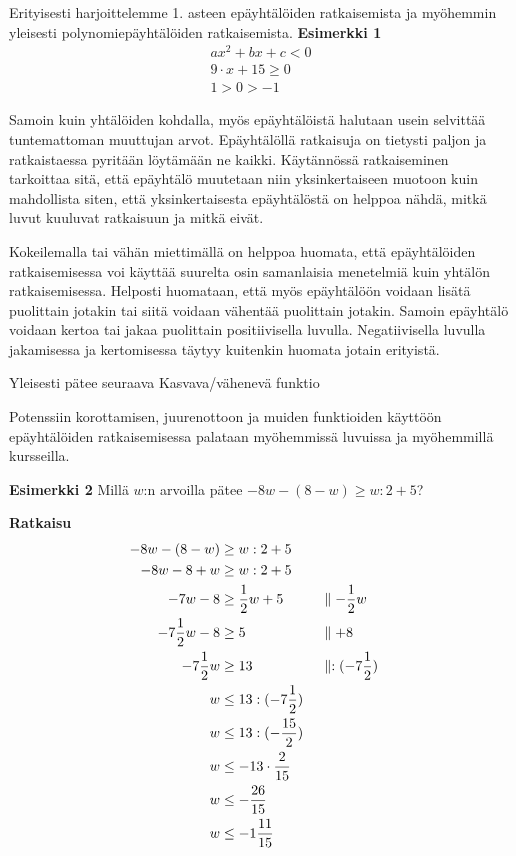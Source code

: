 Erityisesti harjoittelemme 1. asteen epäyhtälöiden ratkaisemista ja myöhemmin yleisesti polynomiepäyhtälöiden ratkaisemista.
\textbf{Esimerkki 1}
\begin{align*}
ax^2+bx+c<0 \\
9 \cdot x+15\geq 0 \\
1>0>-1
\end{align*}

Samoin kuin yhtälöiden kohdalla, myös epäyhtälöistä halutaan usein selvittää
tuntemattoman muuttujan arvot. Epäyhtälöllä ratkaisuja on tietysti paljon ja ratkaistaessa
pyritään löytämään ne kaikki. Käytännössä ratkaiseminen tarkoittaa sitä, että epäyhtälö
muutetaan niin yksinkertaiseen muotoon kuin mahdollista siten, että yksinkertaisesta epäyhtälöstä
on helppoa nähdä, mitkä luvut kuuluvat ratkaisuun ja mitkä eivät.

Kokeilemalla tai vähän miettimällä on helppoa huomata, että epäyhtälöiden ratkaisemisessa
voi käyttää suurelta osin samanlaisia menetelmiä kuin yhtälön ratkaisemisessa. Helposti huomataan,
että myös epäyhtälöön voidaan lisätä puolittain jotakin tai siitä voidaan vähentää puolittain jotakin.
Samoin epäyhtälö voidaan kertoa tai jakaa puolittain positiivisella luvulla. Negatiivisella luvulla
jakamisessa ja kertomisessa täytyy kuitenkin huomata jotain erityistä.


Yleisesti pätee seuraava
	Kasvava/vähenevä funktio




Potenssiin korottamisen, juurenottoon ja muiden funktioiden käyttöön epäyhtälöiden ratkaisemisessa palataan myöhemmissä luvuissa ja myöhemmillä kursseilla.

\textbf{Esimerkki 2}
Millä $w$:n arvoilla pätee $-8w-(8-w)\geq w:2+5$?

\textbf{Ratkaisu}
\begin{align*}
-8w-(8-w)&\geq w:2+5 \\
-8w-8+w&\geq w:2+5 \\
-7w-8&\geq \frac12 w+5  \ \ \ \ \ &&\parallel -\frac12 w \\
-7\frac12 w-8&\geq 5  \ \ \ \ \ &&\parallel +8 \\
-7\frac12 w&\geq 13  \ \ \ \ \ &&\parallel :(-7\frac12) \\
w&\leq 13:(-7\frac12) \\
w&\leq 13:(-\frac{15}{2}) \\
w&\leq -13\cdot \frac{2}{15} \\
w&\leq -\frac{26}{15} \\
w&\leq -1\frac{11}{15}
\end{align*}

